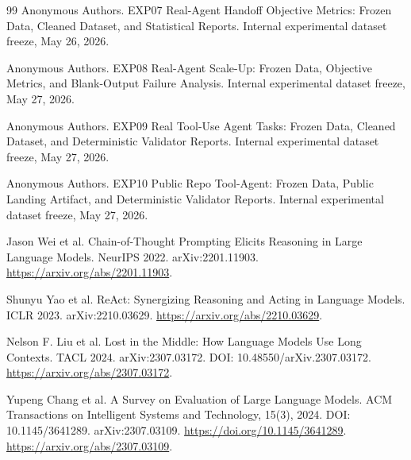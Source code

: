 \documentclass[11pt]{article}
\begin{document}
\begin{thebibliography}{99}
Anonymous Authors.
\newblock EXP07 Real-Agent Handoff Objective Metrics: Frozen Data, Cleaned Dataset, and Statistical Reports.
\newblock Internal experimental dataset freeze, May 26, 2026.

Anonymous Authors.
\newblock EXP08 Real-Agent Scale-Up: Frozen Data, Objective Metrics, and Blank-Output Failure Analysis.
\newblock Internal experimental dataset freeze, May 27, 2026.

Anonymous Authors.
\newblock EXP09 Real Tool-Use Agent Tasks: Frozen Data, Cleaned Dataset, and Deterministic Validator Reports.
\newblock Internal experimental dataset freeze, May 27, 2026.

Anonymous Authors.
\newblock EXP10 Public Repo Tool-Agent: Frozen Data, Public Landing Artifact, and Deterministic Validator Reports.
\newblock Internal experimental dataset freeze, May 27, 2026.

Jason Wei et al.
\newblock Chain-of-Thought Prompting Elicits Reasoning in Large Language Models.
\newblock NeurIPS 2022. arXiv:2201.11903.
\newblock \url{https://arxiv.org/abs/2201.11903}.

Shunyu Yao et al.
\newblock ReAct: Synergizing Reasoning and Acting in Language Models.
\newblock ICLR 2023. arXiv:2210.03629.
\newblock \url{https://arxiv.org/abs/2210.03629}.

Nelson F. Liu et al.
\newblock Lost in the Middle: How Language Models Use Long Contexts.
\newblock TACL 2024. arXiv:2307.03172. DOI: 10.48550/arXiv.2307.03172.
\newblock \url{https://arxiv.org/abs/2307.03172}.

Yupeng Chang et al.
\newblock A Survey on Evaluation of Large Language Models.
\newblock ACM Transactions on Intelligent Systems and Technology, 15(3), 2024.
\newblock DOI: 10.1145/3641289. arXiv:2307.03109.
\newblock \url{https://doi.org/10.1145/3641289}.
\newblock \url{https://arxiv.org/abs/2307.03109}.

\end{thebibliography}
\end{document}
